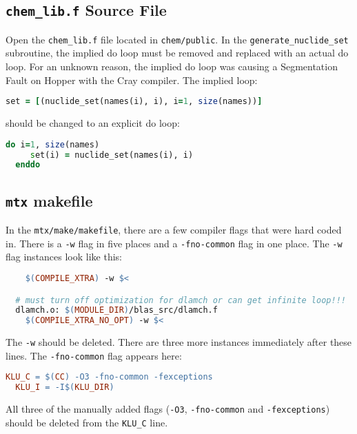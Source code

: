 \subsection{{\tt chem\_lib.f} Source File}

Open the {\tt chem\_lib.f} file located in {\tt chem/public}. In the 
{\tt generate\_nuclide\_set} subroutine, the implied do loop must be removed 
and replaced with an actual do loop. For an unknown reason, the implied do 
loop was causing a Segmentation Fault on Hopper with the Cray compiler. The 
implied loop:
\begin{lstlisting}[language=fortran,mathescape=false]
  set = [(nuclide_set(names(i), i), i=1, size(names))]
\end{lstlisting}
should be changed to an explicit do loop:
\begin{lstlisting}[language=fortran,mathescape=false]
  do i=1, size(names)
     set(i) = nuclide_set(names(i), i)
  enddo
\end{lstlisting}


\subsection{{\tt mtx} makefile}

In the {\tt mtx/make/makefile}, there are a few compiler flags that were hard 
coded in. There is a {\tt -w} flag in five places and a {\tt -fno-common} 
flag in one place. The {\tt -w} flag instances look like this:
\begin{lstlisting}[language=make,mathescape=false]
  %.o: $(MODULE_DIR)/lapack_src/%.f
  	$(COMPILE_XTRA) -w $<

  # must turn off optimization for dlamch or can get infinite loop!!!
  dlamch.o: $(MODULE_DIR)/blas_src/dlamch.f
  	$(COMPILE_XTRA_NO_OPT) -w $<
\end{lstlisting}
The {\tt -w} should be deleted. There are three more instances immediately 
after these lines. The {\tt -fno-common} flag appears here:
\begin{lstlisting}[language=make,mathescape=false]
  KLU_C = $(CC) -O3 -fno-common -fexceptions
  KLU_I = -I$(KLU_DIR)
\end{lstlisting}
All three of the manually added flags ({\tt -O3}, {\tt -fno-common} and 
{\tt -fexceptions}) should be deleted from the {\tt KLU\_C} line.

